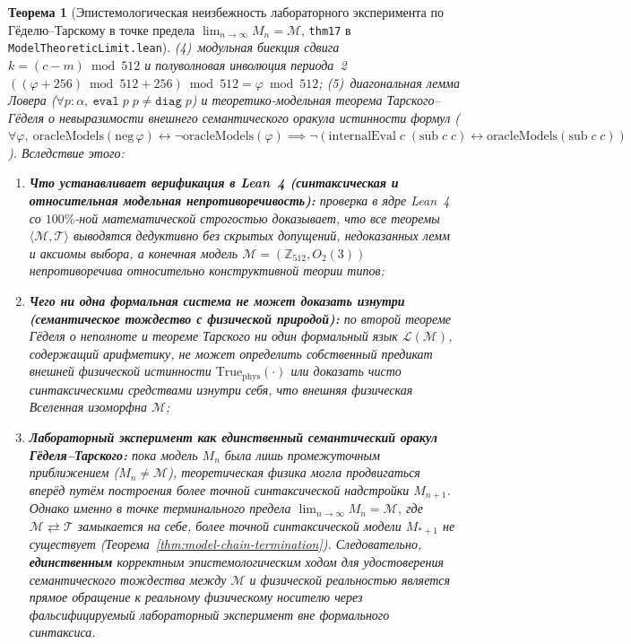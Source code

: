 \documentclass[11pt,a4paper]{article}
\newtheorem{theorem}{Теорема}[section]
\theoremstyle{definition}
\theoremstyle{remark}
\begin{document}
\begin{theorem}[Эпистемологическая неизбежность лабораторного эксперимента по Гёделю--Тарскому в точке предела $\lim_{n\to\infty} M_n = \mathcal{M}$, \texttt{thm17} в \texttt{ModelTheoreticLimit.lean}]
(4)~модульная биекция сдвига $k = (c-m)\bmod 512$ и полуволновая инволюция периода~2 $((\varphi+256)\bmod 512 + 256)\bmod 512 = \varphi\bmod 512$;
(5)~диагональная лемма Ловера ($\forall p : \alpha,\ \texttt{eval}\;p\;p \ne \texttt{diag}\;p$) и теоретико-модельная теорема Тарского--Гёделя о невыразимости внешнего семантического оракула истинности формул ($\forall\varphi,\ \mathrm{oracleModels}(\mathrm{neg}\,\varphi)\leftrightarrow\neg\mathrm{oracleModels}(\varphi)\implies\neg(\mathrm{internalEval}\;c\;(\mathrm{sub}\;c\;c)\leftrightarrow\mathrm{oracleModels}(\mathrm{sub}\;c\;c))$). Вследствие этого:
\begin{enumerate}[label=\textbf{(\roman*)},leftmargin=*]
\item \textbf{Что устанавливает верификация в Lean~4 (синтаксическая и относительная модельная непротиворечивость):}
  проверка в ядре Lean~4 со $100\%$-ной математической строгостью доказывает, что все теоремы $\langle\mathcal{M},\mathcal{T}\rangle$ выводятся дедуктивно без скрытых допущений, недоказанных лемм и аксиомы выбора, а конечная модель $\mathcal{M} = (\mathbb{Z}_{512}, O_2(3))$ непротиворечива относительно конструктивной теории типов;
\item \textbf{Чего ни одна формальная система не может доказать изнутри (семантическое тождество с физической природой):}
  по второй теореме Гёделя о неполноте и теореме Тарского ни один формальный язык $\mathcal{L}(\mathcal{M})$, содержащий арифметику, не может определить собственный предикат внешней физической истинности $\mathrm{True}_{\mathrm{phys}}(\cdot)$ или доказать чисто синтаксическими средствами изнутри себя, что внешняя физическая Вселенная изоморфна $\mathcal{M}$;
\item \textbf{Лабораторный эксперимент как единственный семантический оракул Гёделя--Тарского:}
  пока модель $M_n$ была лишь промежуточным приближением ($M_n \ne \mathcal{M}$), теоретическая физика могла продвигаться вперёд путём построения более точной синтаксической надстройки $M_{n+1}$. Однако именно в точке терминального предела $\lim_{n\to\infty} M_n = \mathcal{M}$, где $\mathcal{M}\rightleftarrows\mathcal{T}$ замыкается на себе, более точной синтаксической модели $M_{*+1}$ не существует (Теорема~\ref{thm:model-chain-termination}). Следовательно, \textbf{единственным} корректным эпистемологическим ходом для удостоверения семантического тождества между $\mathcal{M}$ и физической реальностью является прямое обращение к реальному физическому носителю через фальсифицируемый лабораторный эксперимент вне формального синтаксиса.
\end{enumerate}
\end{theorem}
\end{document}
